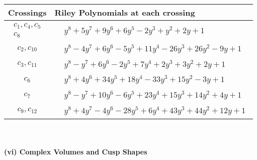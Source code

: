 \documentclass[1p]{elsarticle_modified}
\theoremstyle{definition}
\begin{document}
\begin{tabular}{m{50pt}|m{274pt}}
Crossings & \hspace{64pt}Riley Polynomials at each crossing \\
\hline $$\begin{aligned}c_{1},c_{4},c_{5}\\c_{8}\end{aligned}$$&$\begin{aligned}
&y^8+5 y^7+9 y^6+6 y^5-2 y^3+y^2+2 y+1
\end{aligned}$\\
\hline $$\begin{aligned}c_{2},c_{10}\end{aligned}$$&$\begin{aligned}
&y^8-4 y^7+6 y^6-5 y^5+11 y^4-26 y^3+26 y^2-9 y+1
\end{aligned}$\\
\hline $$\begin{aligned}c_{3},c_{11}\end{aligned}$$&$\begin{aligned}
&y^8- y^7+6 y^6-2 y^5+7 y^4+2 y^3+3 y^2+2 y+1
\end{aligned}$\\
\hline $$\begin{aligned}c_{6}\end{aligned}$$&$\begin{aligned}
&y^8+4 y^6+34 y^5+18 y^4-33 y^3+15 y^2-3 y+1
\end{aligned}$\\
\hline $$\begin{aligned}c_{7}\end{aligned}$$&$\begin{aligned}
&y^8- y^7+10 y^6-6 y^5+23 y^4+15 y^3+14 y^2+4 y+1
\end{aligned}$\\
\hline $$\begin{aligned}c_{9},c_{12}\end{aligned}$$&$\begin{aligned}
&y^8+4 y^7-4 y^6-28 y^5+6 y^4+43 y^3+44 y^2+12 y+1
\end{aligned}$\\
\hline
\end{tabular}\\~\\
\newpage\flushleft \textbf{(vi) Complex Volumes and Cusp Shapes}
\end{document}
